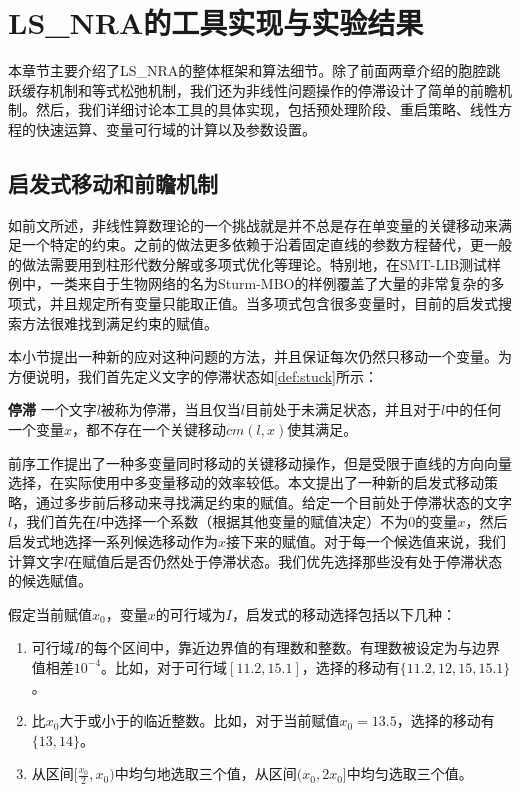 \chapter{LS\_NRA的工具实现与实验结果}\label{chap:implementation}

本章节主要介绍了LS\_NRA的整体框架和算法细节。除了前面两章介绍的胞腔跳跃缓存机制和等式松弛机制，我们还为非线性问题操作的停滞设计了简单的前瞻机制。然后，我们详细讨论本工具的具体实现，包括预处理阶段、重启策略、线性方程的快速运算、变量可行域的计算以及参数设置。

\section{启发式移动和前瞻机制}
如前文所述，非线性算数理论的一个挑战就是并不总是存在单变量的关键移动来满足一个特定的约束。之前的做法更多依赖于沿着固定直线的参数方程替代\cite{LiXZ23}，更一般的做法需要用到柱形代数分解或多项式优化等理论。特别地，在SMT-LIB测试样例中，一类来自于生物网络\cite{AkutsuHT08}的名为Sturm-MBO的样例覆盖了大量的非常复杂的多项式，并且规定所有变量只能取正值。当多项式包含很多变量时，目前的启发式搜索方法很难找到满足约束的赋值。

本小节提出一种新的应对这种问题的方法，并且保证每次仍然只移动一个变量。为方便说明，我们首先定义文字的停滞状态如\ref{def:stuck}所示：

\begin{definition}{\textbf{停滞}}
    一个文字$l$被称为停滞，当且仅当$l$目前处于未满足状态，并且对于$l$中的任何一个变量$x$，都不存在一个关键移动$cm(l, x)$使其满足。
\label{def:stuck}
\end{definition}

前序工作\cite{LiXZ23}提出了一种多变量同时移动的关键移动操作，但是受限于直线的方向向量选择，在实际使用中多变量移动的效率较低。本文提出了一种新的启发式移动策略，通过多步前后移动来寻找满足约束的赋值。给定一个目前处于停滞状态的文字$l$，我们首先在$l$中选择一个系数（根据其他变量的赋值决定）不为0的变量$x$，然后启发式地选择一系列候选移动作为$x$接下来的赋值。对于每一个候选值来说，我们计算文字$l$在赋值后是否仍然处于停滞状态。我们优先选择那些没有处于停滞状态的候选赋值。

假定当前赋值$x_0$，变量$x$的可行域为$I$，启发式的移动选择包括以下几种：
\begin{enumerate}
    \item 可行域$I$的每个区间中，靠近边界值的有理数和整数。有理数被设定为与边界值相差$10^{-4}$。比如，对于可行域$[11.2, 15.1]$，选择的移动有$\{11.2, 12, 15, 15.1\}$。
    \item 比$x_0$大于或小于的临近整数。比如，对于当前赋值$x_0 = 13.5$，选择的移动有$\{13, 14\}$。
    \item 从区间$[\frac{x_0}{2}, x_0)$中均匀地选取三个值，从区间$(x_0, 2x_0]$中均匀选取三个值。
\label{en:look-ahead}
\end{enumerate}

